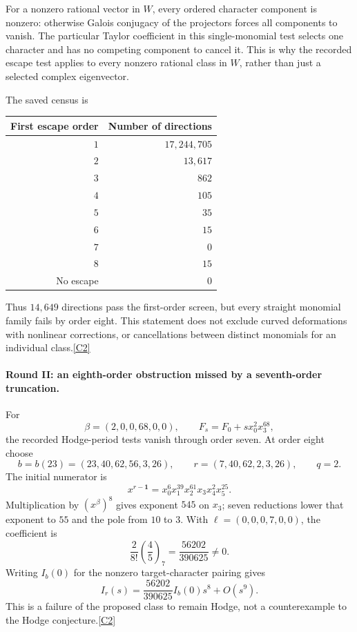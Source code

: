 \documentclass[11pt]{article}
\newcommand{\src}[1]{\hyperlink{src:#1}{[#1]}}
\begin{document}
For a nonzero rational vector in $W$, every ordered character component is
nonzero: otherwise Galois conjugacy of the projectors forces all components
to vanish. The particular Taylor coefficient in this single-monomial test
selects one character and has no competing component to cancel it. This is
why the recorded escape test applies to every nonzero rational class in
$W$, rather than just a selected complex eigenvector.

The saved census is
\begin{center}
\begin{tabular}{rr}
\toprule
First escape order & Number of directions\\
\midrule
$1$ & $17,244,705$\\
$2$ & $13,617$\\
$3$ & $862$\\
$4$ & $105$\\
$5$ & $35$\\
$6$ & $15$\\
$7$ & $0$\\
$8$ & $15$\\
No escape & $0$\\
\bottomrule
\end{tabular}
\end{center}
Thus $14,649$ directions pass the first-order screen, but every straight
monomial family fails by order eight. This statement does not exclude
curved deformations with nonlinear corrections, or cancellations between
distinct monomials for an individual class.\src{C2}

\paragraph{Round II: an eighth-order obstruction missed by a seventh-order truncation.}
For
\[
 \beta=(2,0,0,68,0,0),\qquad F_s=F_0+s x_0^2x_3^{68},
\]
the recorded Hodge-period tests vanish through order seven. At order eight
choose
\[
 b=b(23)=(23,40,62,56,3,26),\qquad
 r=(7,40,62,2,3,26),\qquad q=2.
\]
The initial numerator is
\[
 x^{r-\mathbf1}=x_0^6x_1^{39}x_2^{61}x_3x_4^2x_5^{25}.
\]
Multiplication by $(x^\beta)^8$ gives exponent $545$ on $x_3$;
seven reductions lower that exponent to $55$ and the pole from $10$ to $3$.
With $\ell=(0,0,0,7,0,0)$, the coefficient is
\begin{equation}\label{hodge:eighth}
 \frac{2}{8!}\left(\frac45\right)_7
 =\frac{56202}{390625}\ne0.
\end{equation}
Writing $I_b(0)$ for the nonzero target-character pairing gives
\[
 I_r(s)=\frac{56202}{390625}I_b(0)s^8+O(s^9).
\]
This is a failure of the proposed class to remain Hodge, not a counterexample
to the Hodge conjecture.\src{C2}
\end{document}
